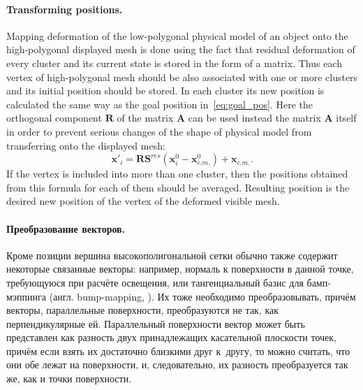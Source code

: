\documentclass[a4paper, 12pt, titlepage]{extarticle}
\newcommand{\eng}[1]{#1}
\newcommand{\vect}[1]{\mathbf{#1}} %
\newcommand{\matx}[1]{\mathbf{#1}} %
\begin{document}
        \paragraph{Transforming positions.}
        Mapping deformation of the low-polygonal physical model of an object onto the high-polygonal
        displayed mesh is done using the fact that residual deformation of every cluster and its
        current state is stored in the form of a matrix. Thus each vertex of high-polygonal mesh
        should be also associated with one or more clusters and its initial position should be
        stored. In each cluster its new position is calculated the same way as the goal position
        in~\eqref{eq:goal_pos}. Here the orthogonal component $\matx R$ of the matrix $\matx A$ can
        be used instead the matrix $\matx A$ itself in order to prevent serious changes of the shape
        of physical model from transferring onto the displayed mesh:
        \begin{equation}\label{eq:graphical_pos}
          \vect{x}'_i = \matx{R} \matx{S}^{res} (\vect{x}^0_i - \vect{x}^0_{c.m.}) + \vect{x}_{c.m.}.
        \end{equation}
        If the vertex is included into more than one cluster, then the positions obtained from this
        formula for each of them should be averaged. Resulting position is the desired new position
        of the vertex of the deformed visible mesh.

\begin{original}
        \paragraph{Преобразование векторов.}
        Кроме позиции вершина высокополигональной сетки обычно также содержит некоторые связанные векторы:
        например, нормаль к поверхности в данной точке, требующуюся при расчёте освещения, или
        тангенциальный базис для бамп-мэппинга (англ. \eng{bump-mapping}, \cite{blinn-bump}). Их тоже необходимо
        преобразовывать, причём векторы, параллельные поверхности, преобразуются не так, как
        перпендикулярные ей. Параллельный поверхности вектор может быть представлен как разность двух
        принадлежащих касательной плоскости точек, причём если взять их достаточно близкими друг
        к~другу, то можно считать, что они обе лежат на поверхности, и, следовательно, их разность
        преобразуется так же, как и точки поверхности.
\end{original}
\end{document}
